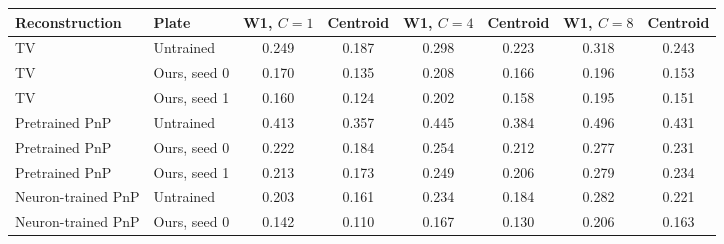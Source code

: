 \begin{tabular}{@{}llcccccc@{}}
\toprule
Reconstruction & Plate & W1, $C=1$ & Centroid & W1, $C=4$ & Centroid & W1, $C=8$ & Centroid\\
\midrule
TV & Untrained & 0.249 & 0.187 & 0.298 & 0.223 & 0.318 & 0.243\\
TV & Ours, seed 0 & 0.170 & 0.135 & 0.208 & 0.166 & 0.196 & 0.153\\
TV & Ours, seed 1 & 0.160 & 0.124 & 0.202 & 0.158 & 0.195 & 0.151\\
Pretrained PnP & Untrained & 0.413 & 0.357 & 0.445 & 0.384 & 0.496 & 0.431\\
Pretrained PnP & Ours, seed 0 & 0.222 & 0.184 & 0.254 & 0.212 & 0.277 & 0.231\\
Pretrained PnP & Ours, seed 1 & 0.213 & 0.173 & 0.249 & 0.206 & 0.279 & 0.234\\
Neuron-trained PnP & Untrained & 0.203 & 0.161 & 0.234 & 0.184 & 0.282 & 0.221\\
Neuron-trained PnP & Ours, seed 0 & 0.142 & 0.110 & 0.167 & 0.130 & 0.206 & 0.163\\
\bottomrule
\end{tabular}
